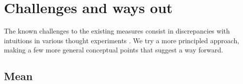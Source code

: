 \documentclass[10pt,]{scrartcl}
\begin{document}
















\section{Challenges and ways out}\label{sec:challenges}


The known challenges to the existing measures  consist in discrepancies with intuitions in various thought experiments \citep{Merricks1995,shogenji1999conducive, Akiba2000Shogenjis, Shogenji2001Reply, bovens2004bayesian,Siebel2004On-Fitelsons-me,siebel2006against,Shogenji2006Why,crupi2007BayesianMeasuresEvidential, koscholke2016evaluating, Schippers2019General}. We try a more principled approach,  making a few more general conceptual points that suggest a way forward. 
















\subsection{Mean}\label{sec:mean}
\end{document}
